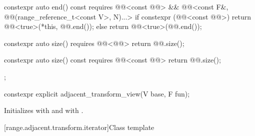 \begin{codeblock}
{{    constexpr auto end() const
      requires @@<const @@> &&
               @@<const F&, @@(range_reference_t<const V>, N)...> {
      if constexpr (@@<const @@>) {
        return @@<true>(*this, @@.end());
      } else {
        return @@<true>(@@.end());
      }
    }

    constexpr auto size() requires @@<@@> {
      return @@.size();
    }

    constexpr auto size() const requires @@<const @@> {
      return @@.size();
    }
  };
}
\end{codeblock}

\begin{itemdecl}
constexpr explicit adjacent_transform_view(V base, F fun);
\end{itemdecl}

\begin{itemdescr}
\pnum
\effects
Initializes  with  and
 with .
\end{itemdescr}

[range.adjacent.transform.iterator]{Class template }


